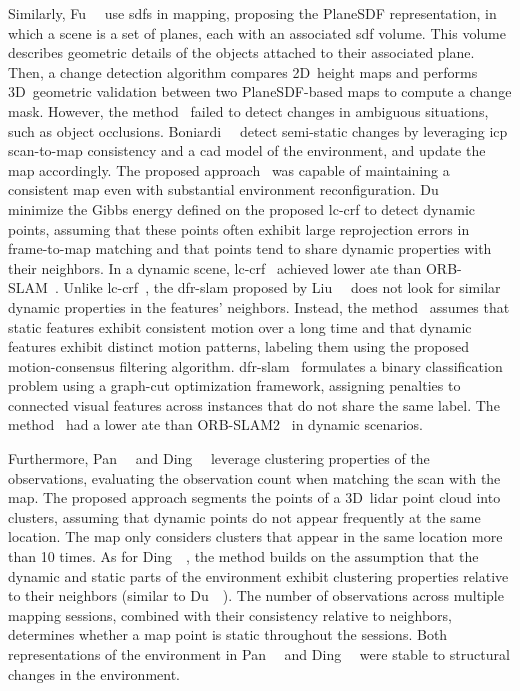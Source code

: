 Similarly, Fu~\etal~\cite{fu:ral:2022} use \glspl{sdf} in mapping,
proposing the PlaneSDF representation, in which a scene is a set of planes,
each with an associated \gls{sdf} volume.
This volume describes geometric details of the objects
attached to their associated plane. Then, a change detection algorithm compares
2D~height maps and performs 3D~geometric validation between
two PlaneSDF-based maps to compute a change mask.
However, the method~\cite{fu:ral:2022} failed to detect changes in ambiguous
situations, such as object occlusions.
Boniardi~\etal~\cite{boniardi:ras:2019} detect semi-static changes
by leveraging \gls{icp} scan-to-map consistency and a \gls{cad} model
of the environment, and update the map accordingly.
The proposed approach~\cite{boniardi:ras:2019} was capable of maintaining
a consistent map even with substantial environment reconfiguration.
Du~\etal~\cite{du:tvcg:2022} minimize the Gibbs energy defined on
the proposed \gls{lc-crf} to detect dynamic points,
assuming that these points often exhibit large reprojection errors
in frame-to-map matching and that points tend to share dynamic properties
with their neighbors. In a dynamic scene, \gls{lc-crf}~\cite{du:tvcg:2022}
achieved lower \gls{ate} than ORB-SLAM~\cite{mur-artal:tro:2015}.
Unlike \gls{lc-crf}~\cite{du:tvcg:2022}, the \gls{dfr-slam} proposed by
Liu~\etal~\cite{liu:scic:2022} does not look for similar dynamic properties
in the features' neighbors. Instead, the method~\cite{liu:scic:2022}
assumes that static features exhibit consistent motion over a long time
and that dynamic features exhibit distinct motion patterns,
labeling them using the proposed motion-consensus filtering algorithm.
\gls{dfr-slam}~\cite{liu:scic:2022} formulates a binary classification problem
using a graph-cut optimization framework, assigning penalties
to connected visual features across instances that do not share the same label.
The method~\cite{liu:scic:2022} had a lower \gls{ate} than
ORB-SLAM2~\cite{mur-artal-tardos:tro:2017} in dynamic scenarios.

Furthermore, Pan~\etal~\cite{pan:sensors:2019} and
Ding~\etal~\cite{ding:tits:2020} leverage clustering properties
of the observations, evaluating the observation count
when matching the scan with the map. The proposed approach segments
the points of a 3D~\gls{lidar} point cloud into clusters, assuming that
dynamic points do not appear frequently at the same location. The map only
considers clusters that appear in the same location more than 10 times.
As for Ding~\etal~\cite{ding:tits:2020}, the method builds on the assumption
that the dynamic and static parts of the environment exhibit
clustering properties relative to their neighbors
(similar to Du~\etal~\cite{du:tvcg:2022}).
The number of observations across multiple mapping sessions,
combined with their consistency relative to neighbors,
determines whether a map point is static throughout the sessions.
Both representations of the environment in
Pan~\etal~\cite{pan:sensors:2019} and Ding~\etal~\cite{ding:tits:2020}
were stable to structural changes in the environment.

